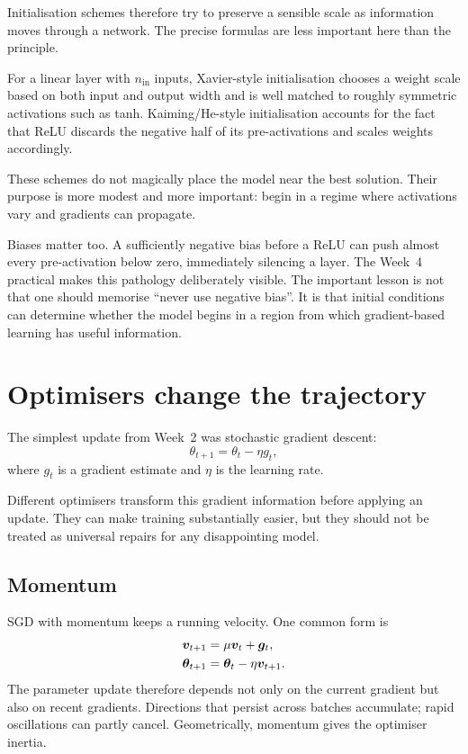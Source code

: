 Initialisation schemes therefore try to preserve a sensible scale as information moves through a network. The precise formulas are less important here than the principle.

For a linear layer with \(n_{\mathrm{in}}\) inputs, Xavier-style initialisation chooses a weight scale based on both input and output width and is well matched to roughly symmetric activations such as tanh. Kaiming/He-style initialisation accounts for the fact that ReLU discards the negative half of its pre-activations and scales weights accordingly.

These schemes do not magically place the model near the best solution. Their purpose is more modest and more important: begin in a regime where activations vary and gradients can propagate.

Biases matter too. A sufficiently negative bias before a ReLU can push almost every pre-activation below zero, immediately silencing a layer. The Week~4 practical makes this pathology deliberately visible. The important lesson is not that one should memorise ``never use negative bias''. It is that initial conditions can determine whether the model begins in a region from which gradient-based learning has useful information.

\section{Optimisers change the trajectory}

The simplest update from Week~2 was stochastic gradient descent:
\begin{equation}
  \theta_{t+1}=\theta_t-\eta g_t,
\end{equation}
where \(g_t\) is a gradient estimate and \(\eta\) is the learning rate.

Different optimisers transform this gradient information before applying an update. They can make training substantially easier, but they should not be treated as universal repairs for any disappointing model.

\subsection{Momentum}

SGD with momentum keeps a running velocity. One common form is
\begin{align}
  \bm{v}_{t+1} &= \mu\bm{v}_t + \bm{g}_t,\\
  \bm{\theta}_{t+1} &= \bm{\theta}_t - \eta\bm{v}_{t+1}.
\end{align}
The parameter update therefore depends not only on the current gradient but also on recent gradients. Directions that persist across batches accumulate; rapid oscillations can partly cancel. Geometrically, momentum gives the optimiser inertia.

